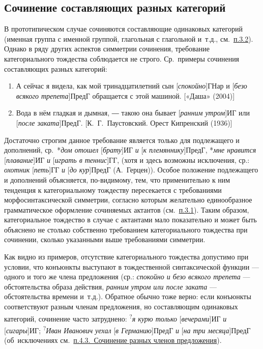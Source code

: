 \subsection{Сочинение составляющих разных
  категорий}\label{ux441ux43eux447ux438ux43dux435ux43dux438ux435-ux441ux43eux441ux442ux430ux432ux43bux44fux44eux449ux438ux445-ux440ux430ux437ux43dux44bux445-ux43aux430ux442ux435ux433ux43eux440ux438ux439}

В прототипическом случае сочиняются составляющие одинаковых категорий
(именная группа с именной группой, глагольная с глагольной и~т.д.,
см.~\underline{п.3.2}). Однако в ряду других аспектов симметрии
сочинения, требование категориального тождества соблюдается не строго.
Ср.~примеры сочинения составляющих разных категорий:

\begin{enumerate}
  \def\labelenumi{(\arabic{enumi})}
  \setcounter{enumi}{30}
  \item
        А сейчас я видела, как мой тринадцатилетний сын
        {[}\textit{спокойно}{]}ГНар и {[}\textit{безо всякого трепета}{]}ПредГ
        обращается с этой машиной. {[}«Даша» (2004){]}
  \item
        Вода в нём гладкая и дымная, ― такою она бывает {[}\textit{ранним
          утром}{]}ИГ или {[}\textit{после заката}{]}ПредГ. {[}К.~Г.~Паустовский.
        Орест Кипренский (1936){]}
\end{enumerate}

Достаточно строгим данное требование является только для подлежащего и
дополнений, ср.~*\textit{дом отошел} {[}\textit{брату}{]}ИГ \textit{и}
{[}\textit{к племяннику}{]}ПредГ, *\textit{мне нравится}
{[}\textit{плавание}{]}ИГ \textit{и} {[}\textit{играть в теннис}{]}ГГ, (хотя и
здесь возможны исключения, ср.: \textit{охотник} {[}\textit{петь}{]}ГГ
\textit{и} {[}\textit{до кур}{]}ПредГ (А.~Герцен)). Особое положение
подлежащего и дополнений объясняется, по-видимому, тем, что
применительно к ним тенденция к категориальному тождеству пересекается с
требованиями морфосинтаксической симметрии, согласно которым желательно
единообразное грамматическое оформление сочиняемых актантов
(см.~\underline{п.3.1}). Таким образом, категориальное тождество в
случае с актантами мало показательно и может быть объяснено не столько
собственно требованием категориального тождества при сочинении, сколько
указанными выше требованиями симметрии.

Как видно из примеров, отсутствие категориального тождества допустимо
при условии, что конъюнкты выступают в тождественной синтаксической
функции --- одного и того же члена предложения (ср.: \textit{спокойно и
  безо всякого трепета} --- обстоятельства образа действия, \textit{ранним
  утром или после заката} --- обстоятельства времени и~т.д.). Обратное
обычно тоже верно: если конъюнкты соответствуют разным членам
предложения, но составляющим одинаковых категорий, сочинение часто
затруднено: \textsuperscript{?}\textit{я курю только}
{[}\textit{вечерами}{]}ИГ \textit{и} {[}\textit{сигары}{]}ИГ;
\textsuperscript{?}\textit{Иван Иванович уехал} {[}\textit{в
  Германию}{]}ПредГ \textit{и} {[}\textit{на три месяца}{]}ПредГ
(об~исключениях см.~\underline{п.4.3.~Сочинение разных членов
  предложения}).

